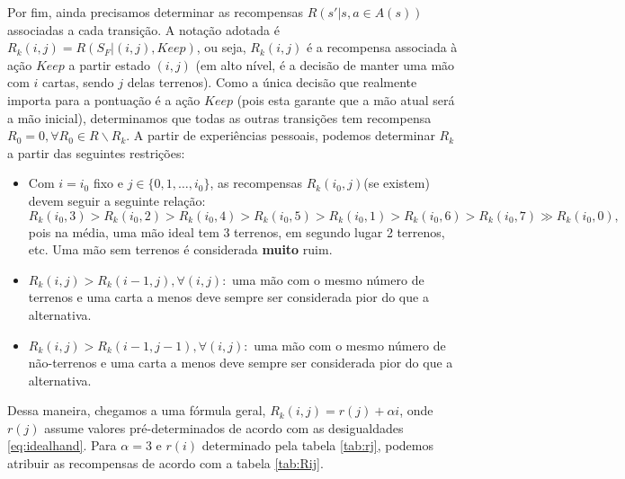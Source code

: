 \documentclass{book}
\begin{document}
Por fim, ainda precisamos determinar as recompensas $R\left(s' | s, a \in A(s) \right)$ associadas a cada transição. A notação adotada é $R_k(i, j) = R(S_F | (i, j), Keep)$, ou seja, $R_k(i, j)$ é a recompensa associada à ação $Keep$ a partir estado $(i, j)$ (em alto nível, é a decisão de manter uma mão com $i$ cartas, sendo $j$ delas terrenos). Como a única decisão que realmente importa para a pontuação é a ação $Keep$ (pois esta garante que a mão atual será a mão inicial), determinamos que todas as outras transições tem recompensa $R_0 = 0, \forall R_0 \in R \backslash R_k$. A partir de experiências pessoais, podemos determinar $R_k$ a partir das seguintes restrições:
\begin{itemize}
  \item Com $i= i_0$ fixo e $j\in\{0,1,\ldots,i_0\}$, as recompensas $R_k(i_0, j)$(se existem) devem seguir a
seguinte relação:
  \begin{equation} \label{eq:idealhand}R_k (i_0, 3) > R_k(i_0, 2) > R_k(i_0, 4)
> R_k(i_0, 5) > R_k(i_0, 1) > R_k(i_0, 6) > R_k(i_0, 7) \gg R_k(i_0,
0),\end{equation}
  pois na média, uma mão ideal tem 3 terrenos, em segundo lugar 2
terrenos, etc. Uma mão sem terrenos é considerada \textbf{muito} ruim.
  \item $R_k(i, j) > R_k(i - 1, j), \forall (i, j):$ uma mão com o mesmo
número de terrenos e uma carta a menos deve sempre ser considerada pior
do que a alternativa.
  \item $R_k(i, j) > R_k(i - 1, j - 1), \forall (i, j):$ uma mão com o mesmo
número de não-terrenos e uma carta a menos deve sempre ser considerada
pior do que a alternativa.
\end{itemize}



Dessa maneira, chegamos a uma fórmula geral, $R_k(i, j) = r(j) + \alpha
i$, onde $r(j)$ assume valores pré-determinados de acordo com
as desigualdades \ref{eq:idealhand}. Para $\alpha = 3$ e $r(i)$ determinado pela tabela
\ref{tab:rj}, podemos atribuir as recompensas de acordo com a tabela
\ref{tab:Rij}.
\end{document}
